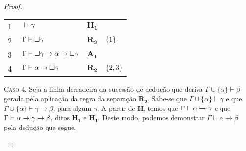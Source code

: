 \begin{tcolorbox}[enhanced jigsaw, breakable, sharp corners, colframe=black, colback=white, boxrule=0.5pt, left=1.5mm, right=1.5mm, top=1.5mm, bottom=1.5mm]
\begin{theorem}[Dedução]
\begin{proof}
        \vspace{0.5\baselineskip}
        \footnotesize
        \setlength{\rowskip}{0.5\baselineskip}
        \begin{xltabular}{\textwidth}{r | X l l}
            \scriptsize{\phantom{0}1}\phantom{ } & $\ \vdash\gamma$                                 & $\mathbf{H_1}$\phantom{1}                & \\[\rowskip]
            \scriptsize{\phantom{0}2}\phantom{ } & $\ \Gamma\vdash\nec\gamma$                       & \hyperref[modal.rule.3]{$\mathbf{R_3}$}  & $\left\{1\right\}$\\[\rowskip]
            \scriptsize{\phantom{0}3}\phantom{ } & $\ \Gamma\vdash\nec\gamma\to\alpha\to\nec\gamma$ & $\hyperref[modal.axiom.1]{\mathbf{A_1}}$ & \\[\rowskip]
            \scriptsize{\phantom{0}4}\phantom{ } & $\ \Gamma\vdash\alpha\to\nec\gamma$              & $\hyperref[modal.rule.2]{\mathbf{R_2}}$  & $\left\{2,3\right\}$
        \end{xltabular}
        \normalsize

        \begin{case}
        \vspace{\baselineskip}
        \textsc{Caso 4.}
        Seja a linha derradeira da sucessão de dedução que deriva $\Gamma\cup\{\alpha\}\vdash\beta$ gerada pela aplicação da regra da separação \hyperref[modal.rule.2]{$\mathbf{R_2}$}.
        Sabe-se que $\Gamma\cup\{\alpha\}\vdash\gamma$ e que $\Gamma\cup\{\alpha\}\vdash\gamma\to\beta$, para algum $\gamma$.
        A partir de $\mathbf{H}$, temos que $\Gamma\mathrel{\vdash}\alpha\to\gamma$ e que $\Gamma\mathrel{\vdash}\alpha\to\gamma\to\beta$, ditos $\mathbf{H_1}$ e $\mathbf{H_1}$.
        Deste modo, podemos demonstrar $\Gamma\vdash\alpha\to\beta$ pela dedução que segue.


\end{case}
\end{proof}
\end{theorem}
\end{tcolorbox}

